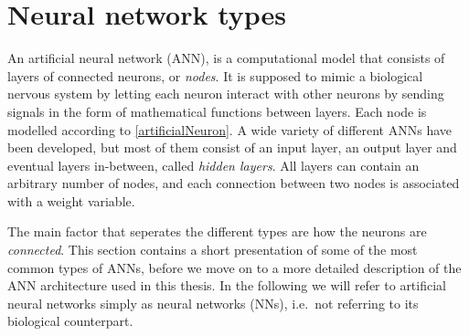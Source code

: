 \documentclass[twoside,english]{uiofysmaster}
\begin{document}
\section{Neural network types}
An artificial neural network (ANN), is a computational model that consists of layers of connected neurons, or \textit{nodes}. 
It is supposed to mimic a biological nervous system by letting each neuron interact with other neurons
by sending signals in the form of mathematical functions between layers. 
Each node is modelled according to \eqref{artificialNeuron}. 
A wide variety of different ANNs have
been developed, but most of them consist of an input layer, an output layer and eventual layers in-between, called
\textit{hidden layers}. All layers can contain an arbitrary number of nodes, and each connection between two nodes
is associated with a weight variable. 

The main factor that seperates the different types are how the neurons are \textit{connected}. 
This section contains a short presentation of some of the most common types of ANNs, before we move on to 
a more detailed description of the ANN architecture used in this thesis. In the following we will refer to artificial 
neural networks simply as neural networks (NNs), i.e.\ not referring to its biological counterpart.  
\end{document}
